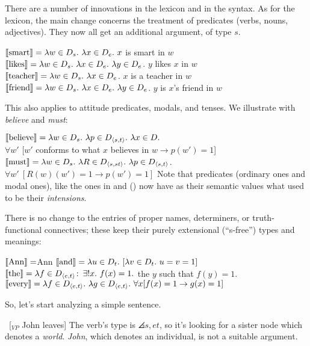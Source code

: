 There are a number of innovations in the lexicon and in the syntax. As for the
lexicon, the main change concerns the treatment of predicates (verbs, nouns,
adjectives). They now all get an additional argument, of type $s$.

\pex\label{124}
\a $\llbracket \mbox{smart} \rrbracket = \lambda w\in D_{s}.\ \lambda x\in D_{e}.\ x$ is smart in $w$ 
\a $\sv{\mbox{likes}} = \lambda w\in D_{s}.\ \lambda x\in D_{e}.\ \lambda y\in D_{e}$. $y$ likes $x$ in $w$ 
\a $\sv{\mbox{teacher}} = \lambda w\in D_{s}.\ \lambda x\in D_{e}$. $x$ is a teacher in $w$ 
\a $\sv{\mbox{friend}} = \lambda w\in D_{s}.\ \lambda x\in D_{e}.\ \lambda y\in D_{e}$. $y$ is $x$'s friend in $w$
\xe

This also applies to attitude predicates, modals, and tenses. We illustrate with
\emph{believe} and \emph{must}:

\pex
\a $\sv{\mbox{believe}} = \lambda w\in D_{s}.\ \lambda p\in D_{\angles{s,t}}.\ \lambda x\in D.$ \\
\null\hfill$\forall w'$ [$w'$ conforms to what $x$ believes in $w \rightarrow p(w') = 1$] 
\a $\sv{\mbox{must}} = \lambda w\in D_{s}.\ \lambda R\in D_{\angles{s,st}}.\ \lambda p\in D_{\angles{s,t}}$.\\
\null\hfill$\forall w'\ [R(w)(w') = 1 \rightarrow p(w') = 1]$
\xe
%
Note that predicates (ordinary ones and modal ones), like the ones in 
and (\lastx) now have as their semantic values what used to be their
\emph{intensions}.

There is no change to the entries of proper names, determiners, or
truth-functional connectives; these keep their purely extensional (``s-free'')
types and meanings:

\pex
\a $\llbracket \mbox{Ann} \rrbracket = $Ann 
\a $\llbracket \mbox{and} \rrbracket = \lambda u\in D_{t}.\ [ \lambda v\in D_{t}.\ u=v=1]$ 
\a $\llbracket \mbox{the} \rrbracket = \lambda f\in D_{\langle e,t \rangle}\colon\thinspace \exists !x.\ f(x) = 1.$ the $y$ such that $f(y) = 1$. 
\a $\llbracket \mbox{every} \rrbracket = \lambda f\in D_{\langle e,t \rangle}.\ \lambda g\in D_{\langle e,t \rangle}.\ \forall x [ f(x) = 1 \rightarrow g(x) = 1]$
\xe

So, let's start analyzing a simple sentence.

\ex\ [$_{VP}$ John leaves] \xe
%
The verb's type is $\angles{s,et}$, so it's looking for a sister node which
denotes a \emph{world}. \emph{John}, which denotes an individual, is not a
suitable argument. 

